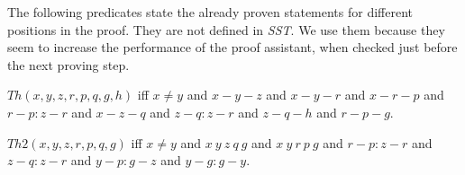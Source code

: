 \documentclass{article}
\newcommand{\OFS}[8]{\operatorname{OFS}
\left(\begin{smallmatrix}%
#1 & #2 & #3 & #4 \\
#5 & #6 & #7 & #8
\end{smallmatrix}\right)%
}
\newcommand{\IFS}[8]{\operatorname{IFS}
\left(\begin{smallmatrix}%
#1 & #2 & #3 & #4 \\
#5 & #6 & #7 & #8
\end{smallmatrix}\right)%
}
\begin{document}
  The following predicates state the already proven statements for different positions in the proof.
  They are not defined in \textit{SST}.
  We use them because they seem to increase the performance of the proof assistant,
  when checked just before the next proving step.

  \begin{forthel}
    \begin{definition} %
      $Th(x,y,z,r,p,q,g,h)$ iff $x \neq y$ and $x-y-z$ and $x-y-r$ and $x-r-p$ and $r-p : z-r$ and $x-z-q$ and $z-q : z-r$ and $z-q-h$ and $r-p-g$.
    \end{definition}

    \begin{definition} %
      $Th2(x,y,z,r,p,q,g)$ iff $x \neq y$ and $x~y~z~q~g$ and $x~y~r~p~g$ and $r-p : z-r$ and $z-q : z-r$ and $y-p : g-z$ and $y-g : g-y$.
    \end{definition}


  \end{forthel}
\end{document}
